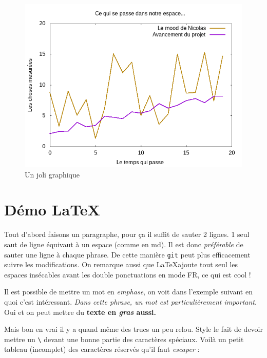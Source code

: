 \documentclass[french]{article}
\begin{document}
\begin{figure}[h]
    \centering
    \includegraphics[width=1\textwidth]{test}
    \caption{Un joli graphique}
    \label{fig:test}
\end{figure}













\section{Démo \LaTeX}

Tout d'abord faisons un paragraphe, pour ça il suffit de sauter 2 lignes.
1 seul saut de ligne équivaut à un espace (comme en md).
Il est donc \emph{préférable} de sauter une ligne à chaque phrase.
De cette manière \lstinline{git} peut plus efficacement suivre les modifications.
On remarque aussi que \LaTeX ajoute tout seul les espaces insécables avant les double ponctuations en mode FR, ce qui est cool !

Il est possible de mettre un mot en \emph{emphase}, on voit dans l'exemple suivant en quoi c'est intéressant.
\textit{Dans cette phrase, un mot est \emph{particulièrement} important}.
Oui et on peut mettre du \textbf{texte en \emph{gras} aussi.}


Mais bon en vrai il y a quand même des trucs un peu relou.
Style le fait de devoir mettre un \lstinline{\} devant une bonne partie des caractères spéciaux.
Voilà un petit tableau (incomplet) des caractères réservés qu'il faut \emph{escaper} :
\end{document}
